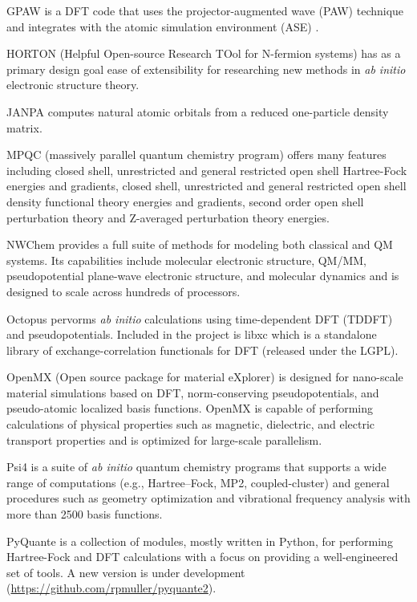 GPAW \cite{gpaw} is a DFT code that uses the projector-augmented wave (PAW) technique \cite{Bl_chl_1994,Kresse_1999} and integrates with the  atomic simulation environment (ASE)  \cite{Bahn_2002}. 

HORTON (Helpful Open-source Research TOol for N-fermion systems) has as a primary design goal ease of extensibility for researching new methods in \textit{ab initio} electronic structure theory.

JANPA \cite{Nikolaienko_2014} computes natural atomic orbitals from a reduced one-particle density matrix.

MPQC (massively parallel quantum chemistry program) \cite{Janssen95} offers many features including closed shell, unrestricted and general restricted open shell Hartree-Fock energies and gradients, closed shell, unrestricted and general restricted open shell density functional theory energies and gradients, second order open shell perturbation theory and Z-averaged perturbation theory energies.

NWChem \cite{Valiev_2010} provides a full suite of methods for modeling both classical and QM systems. Its capabilities include molecular electronic structure, QM/MM, pseudopotential plane-wave electronic structure, and molecular dynamics and is designed to scale across hundreds of processors.

Octopus pervorms \textit{ab initio} calculations using time-dependent DFT (TDDFT) and pseudopotentials.  Included in the project is libxc \cite{Marques_2012} which is a standalone library of exchange-correlation functionals for DFT (released under the LGPL).

OpenMX (Open source package for material eXplorer) \cite{Ozaki_2005} is designed for nano-scale material simulations based on DFT, norm-conserving pseudopotentials, and pseudo-atomic localized basis functions. OpenMX is capable of performing calculations of physical properties such as magnetic, dielectric, and electric transport properties and is optimized for large-scale parallelism.

Psi4 \cite{Turney_2011} is a suite of \textit{ab initio} quantum chemistry programs that supports a wide range of computations (e.g., Hartree–Fock, MP2, coupled-cluster) and general procedures such as geometry optimization and vibrational frequency analysis with more than 2500 basis functions.

PyQuante is a collection of modules, mostly written in Python, for performing Hartree-Fock and DFT calculations with a focus on providing a well-engineered set of tools. A new version is under development (\url{https://github.com/rpmuller/pyquante2}).

